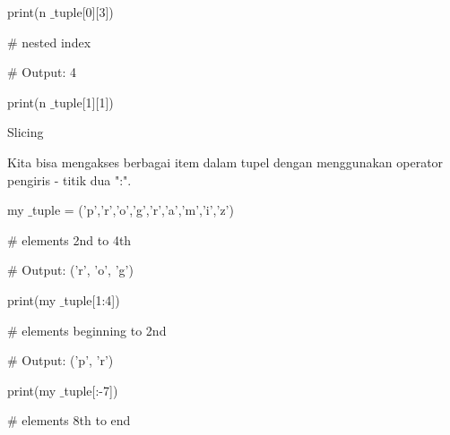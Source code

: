 \documentclass[a4paper,12pt]{report}
\begin{document}
\noindent 
{\fontsize{20pt}{20pt}\selectfont print(n $  \_  $tuple[0][3]) \\} \par
\vspace{20pt}
\noindent 
{\fontsize{20pt}{20pt}\selectfont  $  \#  $ nested index \\} \par
\noindent 
{\fontsize{20pt}{20pt}\selectfont  $  \#  $ Output: 4 \\} \par
\noindent 
{\fontsize{20pt}{20pt}\selectfont print(n $  \_  $tuple[1][1]) \\} \par
\vspace{26pt}
\noindent 
{\fontsize{14pt}{14pt}\selectfont Slicing \\} \par
\vspace{14pt}
\noindent 
{\fontsize{14pt}{14pt}\selectfont Kita bisa mengakses berbagai item dalam tupel dengan menggunakan operator pengiris - titik dua ":". \\} \par
\vspace{20pt}
\noindent 
{\fontsize{20pt}{20pt}\selectfont my $  \_  $tuple = ('p','r','o','g','r','a','m','i','z') \\} \par
\vspace{20pt}
\noindent 
{\fontsize{20pt}{20pt}\selectfont  $  \#  $ elements 2nd to 4th \\} \par
\noindent 
{\fontsize{20pt}{20pt}\selectfont  $  \#  $ Output: ('r', 'o', 'g') \\} \par
\noindent 
{\fontsize{20pt}{20pt}\selectfont print(my $  \_  $tuple[1:4]) \\} \par
\vspace{20pt}
\noindent 
{\fontsize{20pt}{20pt}\selectfont  $  \#  $ elements beginning to 2nd \\} \par
\noindent 
{\fontsize{20pt}{20pt}\selectfont  $  \#  $ Output: ('p', 'r') \\} \par
\noindent 
{\fontsize{20pt}{20pt}\selectfont print(my $  \_  $tuple[:-7]) \\} \par
\vspace{20pt}
\noindent 
{\fontsize{20pt}{20pt}\selectfont  $  \#  $ elements 8th to end \\} \par
\end{document}

